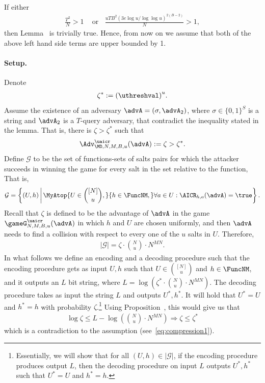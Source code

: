 If either\begin{align*}
\frac{T^2}{N}>1\;\;\; \text{ or } \;\;\frac{uTB^2(3e\log u/\log\log u)^{2(B-2)}}{N}>1,
\end{align*}
 then Lemma~ is trivially true. Hence, from now on we assume that both of the above left hand side terms are upper bounded by 1.

\paragraph{Setup.} Denote 
\begin{align*}
\zeta^* := {\left(\uthreshval\right)}^u.
\end{align*}
%
Assume the existence of an adversary $\advA = (\sigma,\advA_2)$, where $\sigma\in \{0,1\}^S$ is a string and $\advA_2$ is a $T$-query adversary, that contradict the inequality stated in the lemma. That is, there is $\zeta > \zeta^*$ such that
\begin{align}
\Adv_{\MD,N,M,B,u}^{\uaicr}(\advA)  := \zeta > \zeta^*. \label{eq:compression1}
\end{align}
 Define $\mathcal{G}$ to be the set of functions-sets of salts pairs for which the attacker succeeds in winning the game for every salt in the set relative to the function, That is, 
\begin{align*}
\mathcal{G}=\left\{(U,h) \,\middle\vert\, \MyAtop{U\in \binom{[N]}{u},}{h\in \FuncNM,} \forall a \in U:\AICR_{h,a}(\advA)=\true\right\}.
\end{align*}
%
Recall that $\zeta$ is defined to be the advantage of $\advA$ in the game $\gameG^\uaicr_{N,M,B,u}(\advA)$ in which $h$ and $U$ are chosen uniformly, and then $\advA$ needs to find a collision with respect to every one of the  $u$ salts in $U$. Therefore, 
\begin{align*}
| \mathcal G | = \zeta \cdot \binom{N}{u}\cdot N^{MN}.
\end{align*}
In what follows we define an encoding and a decoding procedure such that the encoding procedure gets as input $U,h$ such that $U\in \binom{[N]}{u}$ and $h\in \FuncNM$, and it outputs an $L$ bit string, where $L = \log \left(\zeta^* \cdot \binom{N}{u}\cdot N^{MN}\right)$. The decoding procedure takes as input the string $L$ and outputs $U^*,h^*$. It will hold that $U^*=U$ and $h^* = h$ with probability $\zeta$.\footnote{Essentially, we will show that for all $(U,h)\in |\mathcal{G}|$, if the encoding procedure produces output $L$, then the decoding procedure on input $L$ outputs $U^*,h^*$ such that $U^*=U$ and $h^* = h$.}
Using Proposition~, this would give us that 
\begin{align*}
\log \zeta \le  L - \log \left(\binom{N}{u}\cdot N^{MN}\right) \Longrightarrow \zeta \le \zeta^*
\end{align*}
 which is a contradiction to the assumption (see~\eqref{eq:compression1}). 
 
